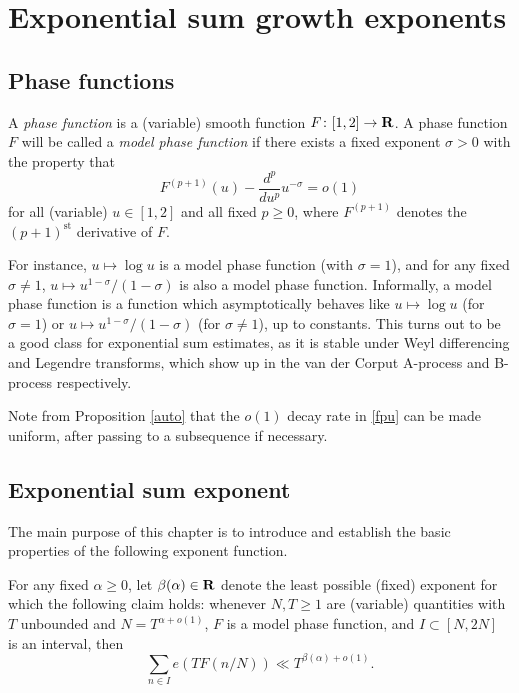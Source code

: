 \chapter{Exponential sum growth exponents}\label{beta-chapter}

\section{Phase functions}

\begin{definition}\label{phase-def}
\leanok
A \emph{phase function} is a (variable) smooth function $F \colon [1,2] \to \mathbf{R}$.  A phase function $F$ will be called a \emph{model phase function} if there exists a fixed exponent $\sigma > 0$ with the property that
\begin{equation}\label{fpu}
F^{(p+1)}(u) - \frac{d^p}{du^p} u^{-\sigma} = o(1)
\end{equation}
for all (variable) $u \in [1,2]$ and all fixed $p \geq 0$, where $F^{(p+1)}$ denotes the $(p+1)^{\mathrm{st}}$ derivative of $F$.
\end{definition}

For instance, $u \mapsto \log u$ is a model phase function (with $\sigma=1$), and for any fixed $\sigma \neq 1$, $u \mapsto u^{1-\sigma}/(1-\sigma)$ is also a model phase function.  Informally, a model phase function is a function which asymptotically behaves like $u \mapsto \log u$ (for $\sigma = 1$) or $u \mapsto u^{1-\sigma}/(1-\sigma)$ (for $\sigma \neq 1$), up to constants.  This turns out to be a good class for exponential sum estimates, as it is stable under Weyl differencing and Legendre transforms, which show up in the van der Corput A-process and B-process respectively.

Note from Proposition \ref{auto} that the $o(1)$ decay rate in \eqref{fpu} can be made uniform, after passing to a subsequence if necessary.

\section{Exponential sum exponent}

The main purpose of this chapter is to introduce and establish the basic properties of the following exponent function.

\begin{definition}\label{beta-def}
\leanok
For any fixed $\alpha \geq 0$, let $\beta(\alpha) \in \mathbf{R}$ denote the least possible (fixed) exponent for which the following claim holds: whenever $N, T \geq 1$ are (variable) quantities with $T$ unbounded and $N = T^{\alpha+o(1)}$, $F$ is a model phase function, and $I \subset [N, 2N]$ is an interval, then
$$ \sum_{n \in I} e(T F(n/N)) \ll T^{\beta(\alpha)+o(1)}.$$
\end{definition}

